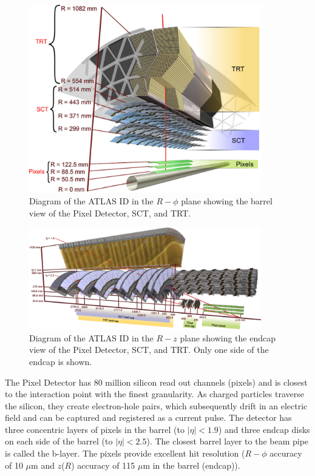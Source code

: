\begin{figure}[!t]
\centering 
\includegraphics[width=0.9\textwidth]{figs/lhc/IDBarrel-eps-converted-to}
\caption{ Diagram of the ATLAS ID in the $R-\phi$ plane showing the barrel view of the Pixel Detector, SCT, and TRT.
}
\label{figure:lhc_id_barrel}
\end{figure}

\begin{figure}[!t]
\centering 
\includegraphics[width=0.9\textwidth]{figs/lhc/IDEndcap-eps-converted-to}
\caption{ Diagram of the ATLAS ID in the $R-z$ plane showing the endcap view of the Pixel Detector, SCT, and TRT. Only one side of the endcap is shown. 
}
\label{figure:lhc_id_endcap}
\end{figure}

The Pixel Detector has 80 million silicon read out channels (pixels) and is closest to the interaction point with the finest granularity. As charged particles traverse the silicon, they create electron-hole pairs, which subsequently drift in an electric field and can be captured and registered as a current pulse. The detector has three concentric layers of pixels in the barrel (to $|\eta| < 1.9$) and three endcap disks on each side of the barrel (to $|\eta| < 2.5$). The closest barrel layer to the beam pipe is called the b-layer. The pixels provide excellent hit resolution ($R-\phi$ accuracy of 10 $\mu$m and $z$($R$) accuracy of 115 $\mu$m in the barrel (endcap)).

